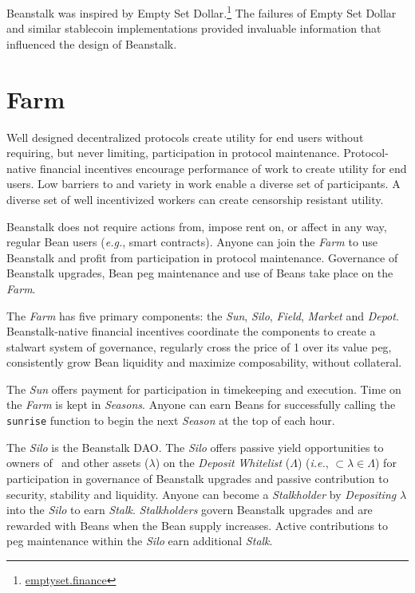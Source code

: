 \documentclass[tikz]{article}
\newcommand{\code}[1]{\texttt{#1}}
\newcommand{\term}[1]{\textsl{#1}}
\newcommand{\fref}[1]{\footnote{\href{http://#1}{#1}}}
\newcommand{\Bean}{} %
\begin{document}
Beanstalk was inspired by Empty Set Dollar.\fref{emptyset.finance} The failures of Empty Set Dollar and similar stablecoin implementations provided invaluable information that influenced the design of Beanstalk.

\section{Farm}
Well designed decentralized protocols create utility for end users without requiring, but never limiting, participation in protocol maintenance. Protocol-native financial incentives encourage performance of work to create utility for end users. Low barriers to and variety in work enable a diverse set of participants. A diverse set of well incentivized workers can create censorship resistant utility. 

Beanstalk does not require actions from, impose rent on, or affect in any way, regular Bean users (\term{e.g.}, smart contracts). Anyone can join the \term{Farm} to use Beanstalk and profit from participation in protocol maintenance. Governance of Beanstalk upgrades, Bean peg maintenance and use of Beans take place on the \term{Farm}.

The \term{Farm} has five primary components: the \term{Sun}, \term{Silo}, \term{Field}, \term{Market} and \term{Depot}. Beanstalk-native financial incentives coordinate the components to create a stalwart system of governance, regularly cross the price of \Bean1 over its value peg, consistently grow Bean liquidity and maximize composability, without collateral.

The \term{Sun} offers payment for participation in timekeeping and execution. Time on the \term{Farm} is kept in \term{Seasons}. Anyone can earn Beans for successfully calling the \code{sunrise} function to begin the next \term{Season} at the top of each hour.

The \term{Silo} is the Beanstalk DAO. The \term{Silo} offers passive yield opportunities to owners of \Bean\ and other assets ($\lambda$) on the \term{Deposit} \term{Whitelist} ($\Lambda$) (\term{i.e.}, $\Bean \subset \lambda \in \Lambda$) for participation in governance of Beanstalk upgrades and passive contribution to security, stability and liquidity. Anyone can become a \term{Stalkholder} by \term{Depositing} $\lambda$ into the \term{Silo} to earn \term{Stalk}. \term{Stalkholders} govern Beanstalk upgrades and are rewarded with Beans when the Bean supply increases. Active contributions to peg maintenance within the \term{Silo} earn additional \term{Stalk}.
\end{document}

